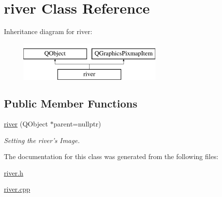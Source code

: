 \hypertarget{classriver}{\section{river Class Reference}
\label{classriver}
}
Inheritance diagram for river\-:\begin{figure}[H]
\begin{center}
\leavevmode
\includegraphics[height=2.000000cm]{classriver}
\end{center}
\end{figure}
\subsection*{Public Member Functions}
\begin{DoxyCompactItemize}
\item 
\hypertarget{classriver_a960a997e38e4de2984933b59b5f54a41}{\hyperlink{classriver_a960a997e38e4de2984933b59b5f54a41}{river} (Q\-Object $\ast$parent=nullptr)}\label{classriver_a960a997e38e4de2984933b59b5f54a41}

\begin{DoxyCompactList}\small\item\em Setting the river's Image. \end{DoxyCompactList}\end{DoxyCompactItemize}


The documentation for this class was generated from the following files\-:\begin{DoxyCompactItemize}
\item 
\hyperlink{river_8h}{river.\-h}\item 
\hyperlink{river_8cpp}{river.\-cpp}\end{DoxyCompactItemize}
